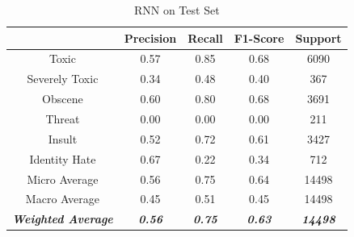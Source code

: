 \documentclass{article}
\begin{document}
{{	  \begin{table}[h!]
		  \centering
		  \begin{tabular}{|c|| c c c c|}
			  \hline
			                                     & Precision              & Recall                 & F1-Score               & Support                 \\ [0.5ex]
			  \hline\hline
			  Toxic                              & 0.57                   & 0.85                   & 0.68                   & 6090                    \\
			  Severely Toxic                     & 0.34                   & 0.48                   & 0.40                   & 367                     \\
			  Obscene                            & 0.60                   & 0.80                   & 0.68                   & 3691                    \\
			  Threat                             & 0.00                   & 0.00                   & 0.00                   & 211                     \\
			  Insult                             & 0.52                   & 0.72                   & 0.61                   & 3427                    \\
			  Identity Hate                      & 0.67                   & 0.22                   & 0.34                   & 712                     \\
			  \hline\hline
			  Micro Average                      & 0.56                   & 0.75                   & 0.64                   & 14498                   \\
			  Macro Average                      & 0.45                   & 0.51                   & 0.45                   & 14498                   \\
			  \textit{\textbf{Weighted Average}} & \textit{\textbf{0.56}} & \textit{\textbf{0.75}} & \textit{\textbf{0.63}} & \textit{\textbf{14498}} \\

			  \hline
		  \end{tabular}
		  \caption{RNN on Test Set}
		  \label{table:rnn-test}
	  \end{table}

}}
\end{document}
